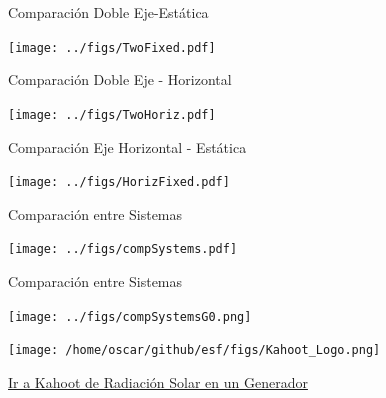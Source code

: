 \documentclass[xcolor={usenames,svgnames,dvipsnames}]{beamer}
\begin{document}
\begin{frame}[label={sec:org95b3822}]{Comparación Doble Eje-Estática}
\begin{center}
\texttt{[image: ../figs/TwoFixed.pdf]}
\end{center}
\end{frame}



\begin{frame}[label={sec:org785da39}]{Comparación Doble Eje - Horizontal}
\begin{center}
\texttt{[image: ../figs/TwoHoriz.pdf]}
\end{center}
\end{frame}



\begin{frame}[label={sec:org0a56ced}]{Comparación Eje Horizontal - Estática}
\begin{center}
\texttt{[image: ../figs/HorizFixed.pdf]}
\end{center}
\end{frame}



\begin{frame}[label={sec:org1424b55}]{Comparación entre Sistemas}
\begin{center}
\texttt{[image: ../figs/compSystems.pdf]}
\end{center}
\end{frame}

\begin{frame}[label={sec:orgfb0b734}]{Comparación entre Sistemas}
\begin{center}
\texttt{[image: ../figs/compSystemsG0.png]}
\end{center}
\end{frame}


\begin{frame}[label={sec:orge8605be}]{}
\begin{center}
\texttt{[image: /home/oscar/github/esf/figs/Kahoot\_Logo.png]}
\end{center}

\href{https://play.kahoot.it/v2/?quizId=29a16906-539a-4e29-b68c-fe6c9141ef02}{Ir a Kahoot de Radiación Solar en un Generador}
\end{frame}
\end{document}
